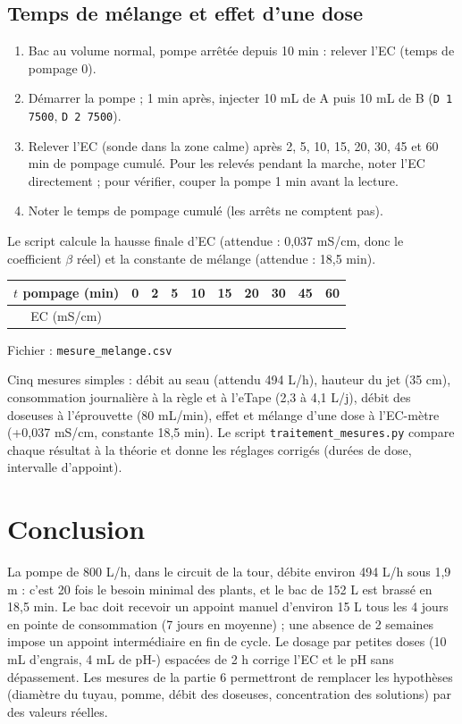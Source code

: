 \documentclass[11pt,a4paper]{article}
\begin{document}
\subsection{Temps de mélange et effet d'une dose}
\begin{enumerate}
  \item Bac au volume normal, pompe arrêtée depuis 10 min : relever l'EC (temps de pompage 0).
  \item Démarrer la pompe ; 1 min après, injecter 10 mL de A puis 10 mL de B (\texttt{D 1 7500}, \texttt{D 2 7500}).
  \item Relever l'EC (sonde dans la zone calme) après 2, 5, 10, 15, 20, 30, 45 et 60 min de pompage cumulé. Pour les relevés pendant la marche, noter l'EC directement ; pour vérifier, couper la pompe 1 min avant la lecture.
  \item Noter le temps de pompage cumulé (les arrêts ne comptent pas).
\end{enumerate}
Le script calcule la hausse finale d'EC (attendue : 0,037 mS/cm, donc le coefficient $\beta$ réel) et la constante de mélange (attendue : 18,5 min).

\begin{center}
\begin{tabular}{|c|c|c|c|c|c|c|c|c|c|}
\hline
$t$ pompage (min) & 0 & 2 & 5 & 10 & 15 & 20 & 30 & 45 & 60 \\ \hline
EC (mS/cm) & & & & & & & & & \\ \hline
\end{tabular}

Fichier : \texttt{mesure\_melange.csv}
\end{center}

\begin{resume}
Cinq mesures simples : débit au seau (attendu 494 L/h), hauteur du jet (35 cm), consommation journalière à la règle et à l'eTape (2,3 à 4,1 L/j), débit des doseuses à l'éprouvette (80 mL/min), effet et mélange d'une dose à l'EC-mètre (+0,037 mS/cm, constante 18,5 min). Le script \texttt{traitement\_mesures.py} compare chaque résultat à la théorie et donne les réglages corrigés (durées de dose, intervalle d'appoint).
\end{resume}

\section{Conclusion}
La pompe de 800 L/h, dans le circuit de la tour, débite environ 494 L/h sous 1,9 m : c'est 20 fois le besoin minimal des plants, et le bac de 152 L est brassé en 18,5 min. Le bac doit recevoir un appoint manuel d'environ 15 L tous les 4 jours en pointe de consommation (7 jours en moyenne) ; une absence de 2 semaines impose un appoint intermédiaire en fin de cycle. Le dosage par petites doses (10 mL d'engrais, 4 mL de pH-) espacées de 2 h corrige l'EC et le pH sans dépassement. Les mesures de la partie 6 permettront de remplacer les hypothèses (diamètre du tuyau, pomme, débit des doseuses, concentration des solutions) par des valeurs réelles.
\end{document}
